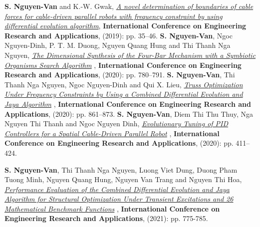 \documentclass{simplecv}
\begin{document}






\cvitem
{\textbf{S. Nguyen-Van} and K.-W. Gwak,
\href{https://link.springer.com/chapter/10.1007/978-3-030-37497-6_4}{ \textit{A novel determination of boundaries of cable forces for cable-driven parallel robots with frequency constraint by using differential evolution algorithm}}, \textbf{International Conference on Engineering Research and Applications}, (2019): pp. 35–46.}
\cvitem
{\textbf{S. Nguyen-Van}, Ngoc Nguyen-Dinh, P. T. M. Duong, Nguyen Quang Hung and Thi Thanh Nga Nguyen, 
\href{https://doi.org/10.1007/978-3-030-64719-3_85}{\textit{The Dimensional Synthesis of the Four-Bar Mechanism with a Symbiotic Organisms Search Algorithm}}
, \textbf{International Conference on Engineering Research and Applications}, (2020): pp. 780–791.}
\cvitem
{\textbf{S. Nguyen-Van}, Thi Thanh Nga Nguyen, Ngoc Nguyen-Dinh and Qui X. Lieu, 
\href{https://link.springer.com/chapter/10.1007/978-3-030-64719-3_95}{	\textit{Truss Optimization Under Frequency Constraints by Using a Combined Differential Evolution and Jaya Algorithm}}
, \textbf{International Conference on Engineering Research and Applications}, (2020): pp. 861–873.}
\cvitem
{\textbf{S. Nguyen-Van}, Diem Thi Thu Thuy, Nga Nguyen Thi Thanh and Ngoc Nguyen Dinh, 
\href{https://link.springer.com/chapter/10.1007/978-3-030-64719-3_46}{\textit{Evolutionary Tuning of PID Controllers for a Spatial Cable-Driven Parallel Robot}}
, \textbf{International Conference on Engineering Research and Applications}, (2020): pp. 411–424.}

\cvitem
{\textbf{S. Nguyen-Van}, Thi Thanh Nga Nguyen, Luong Viet Dung, Duong Pham Tuong Minh, Nguyen Quang Hung, Nguyen Van Trang and Nguyen Thi Hoa, 
	\href{https://doi.org/10.1007/978-3-030-92574-1_79}{\textit{Performance Evaluation of the Combined Differential Evolution and Jaya Algorithm for Structural Optimization Under Transient Excitations and 26 Mathematical Benchmark Functions}}
	, \textbf{International Conference on Engineering Research and Applications}, (2021): pp. 775-785.}
\end{document}
